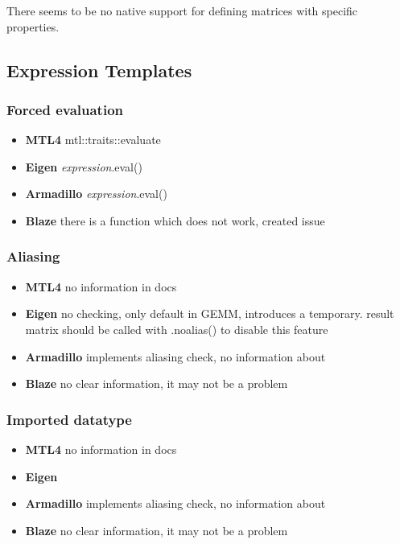 \documentclass{article}
\begin{document}
There seems to be no native support for defining matrices with specific properties.

\subsection{Expression Templates}

\subsubsection{Forced evaluation}
\begin{itemize}
\item \textbf{MTL4} mtl::traits::evaluate \\
\item \textbf{Eigen} \textit{expression}.eval() \\
\item \textbf{Armadillo} \textit{expression}.eval() \\
\item \textbf{Blaze} there is a function which does not work, created issue \\
\end{itemize}

\subsubsection{Aliasing}
\begin{itemize}
\item \textbf{MTL4} no information in docs \\
\item \textbf{Eigen} no checking, only default in GEMM, introduces a temporary. result matrix should be called with .noalias() to disable this feature\\ 
\item \textbf{Armadillo} implements aliasing check, no information about  \\
\item \textbf{Blaze} no clear information, it may not be a problem \\
\end{itemize}

\subsubsection{Imported datatype}
\begin{itemize}
\item \textbf{MTL4} no information in docs \\
\item \textbf{Eigen} \\ 
\item \textbf{Armadillo} implements aliasing check, no information about  \\
\item \textbf{Blaze} no clear information, it may not be a problem \\
\end{itemize}
\end{document}

